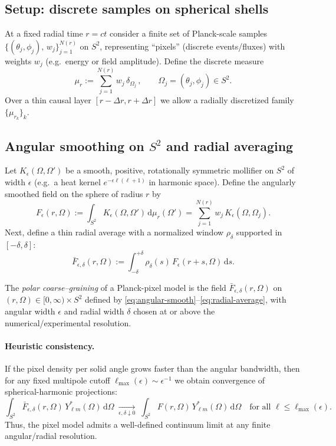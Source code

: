 \documentclass[12pt]{article}
\begin{document}
\subsection{Setup: discrete samples on spherical shells}
At a fixed radial time $r=ct$ consider a finite set of Planck-scale samples 
$\{(\theta_j,\phi_j),\,w_j\}_{j=1}^{N(r)}$ on $S^2$, representing ``pixels'' (discrete events/fluxes) 
with weights $w_j$ (e.g.\ energy or field amplitude). Define the discrete measure
\[
\mu_r := \sum_{j=1}^{N(r)} w_j \,\delta_{\Omega_j}\,,
\qquad \Omega_j=(\theta_j,\phi_j)\in S^2.
\]
Over a thin causal layer $[r-\Delta r,r+\Delta r]$ we allow a radially discretized family 
$\{\mu_{r_k}\}_{k}$.

\subsection{Angular smoothing on $S^2$ and radial averaging}
Let $K_\epsilon(\Omega,\Omega')$ be a smooth, positive, rotationally symmetric mollifier on $S^2$ 
of width $\epsilon$ (e.g.\ a heat kernel $e^{-\epsilon \ell(\ell+1)}$ in harmonic space). 
Define the angularly smoothed field on the sphere of radius $r$ by
\begin{equation}
\label{eq:angular-smooth}
F_\epsilon(r,\Omega) 
:= \int_{S^2} K_\epsilon(\Omega,\Omega')\, \mathrm{d}\mu_r(\Omega')
= \sum_{j=1}^{N(r)} w_j \,K_\epsilon(\Omega,\Omega_j).
\end{equation}
Next, define a thin radial average with a normalized window $\rho_\delta$ supported in $[-\delta,\delta]$:
\begin{equation}
\label{eq:radial-average}
\bar F_{\epsilon,\delta}(r,\Omega)
:= \int_{-\delta}^{+\delta} \rho_\delta(s)\, F_\epsilon(r+s,\Omega)\, \mathrm{d}s.
\end{equation}

\begin{definition}
\label{def:polar-map}
The \emph{polar coarse--graining} of a Planck-pixel model is the field
$\bar F_{\epsilon,\delta}(r,\Omega)$ on $(r,\Omega)\in [0,\infty)\times S^2$ defined by 
\eqref{eq:angular-smooth}--\eqref{eq:radial-average}, with angular width $\epsilon$ 
and radial width $\delta$ chosen at or above the numerical/experimental resolution.
\end{definition}

\paragraph{Heuristic consistency.}
If the pixel density per solid angle grows faster than the angular bandwidth, then for any fixed 
multipole cutoff $\ell_{\max}(\epsilon)\sim \epsilon^{-1}$ we obtain convergence of spherical-harmonic 
projections:
\[
\int_{S^2}\! \bar F_{\epsilon,\delta}(r,\Omega)\, Y_{\ell m}^*(\Omega)\, \mathrm{d}\Omega
\;\xrightarrow[\epsilon,\delta\downarrow 0]{}\;
\int_{S^2}\! F(r,\Omega)\, Y_{\ell m}^*(\Omega)\, \mathrm{d}\Omega
\quad \text{for all } \ell\le \ell_{\max}(\epsilon).
\]
Thus, the pixel model admits a well-defined continuum limit at any finite angular/radial resolution.
\end{document}
